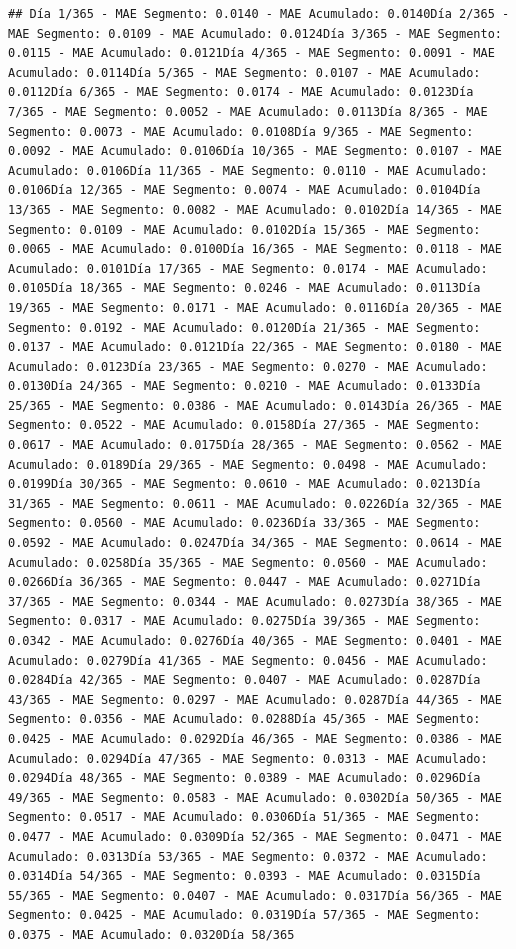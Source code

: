 \documentclass[
]{book}
\begin{document}
\begin{verbatim}
## Día 1/365 - MAE Segmento: 0.0140 - MAE Acumulado: 0.0140Día 2/365 - MAE Segmento: 0.0109 - MAE Acumulado: 0.0124Día 3/365 - MAE Segmento: 0.0115 - MAE Acumulado: 0.0121Día 4/365 - MAE Segmento: 0.0091 - MAE Acumulado: 0.0114Día 5/365 - MAE Segmento: 0.0107 - MAE Acumulado: 0.0112Día 6/365 - MAE Segmento: 0.0174 - MAE Acumulado: 0.0123Día 7/365 - MAE Segmento: 0.0052 - MAE Acumulado: 0.0113Día 8/365 - MAE Segmento: 0.0073 - MAE Acumulado: 0.0108Día 9/365 - MAE Segmento: 0.0092 - MAE Acumulado: 0.0106Día 10/365 - MAE Segmento: 0.0107 - MAE Acumulado: 0.0106Día 11/365 - MAE Segmento: 0.0110 - MAE Acumulado: 0.0106Día 12/365 - MAE Segmento: 0.0074 - MAE Acumulado: 0.0104Día 13/365 - MAE Segmento: 0.0082 - MAE Acumulado: 0.0102Día 14/365 - MAE Segmento: 0.0109 - MAE Acumulado: 0.0102Día 15/365 - MAE Segmento: 0.0065 - MAE Acumulado: 0.0100Día 16/365 - MAE Segmento: 0.0118 - MAE Acumulado: 0.0101Día 17/365 - MAE Segmento: 0.0174 - MAE Acumulado: 0.0105Día 18/365 - MAE Segmento: 0.0246 - MAE Acumulado: 0.0113Día 19/365 - MAE Segmento: 0.0171 - MAE Acumulado: 0.0116Día 20/365 - MAE Segmento: 0.0192 - MAE Acumulado: 0.0120Día 21/365 - MAE Segmento: 0.0137 - MAE Acumulado: 0.0121Día 22/365 - MAE Segmento: 0.0180 - MAE Acumulado: 0.0123Día 23/365 - MAE Segmento: 0.0270 - MAE Acumulado: 0.0130Día 24/365 - MAE Segmento: 0.0210 - MAE Acumulado: 0.0133Día 25/365 - MAE Segmento: 0.0386 - MAE Acumulado: 0.0143Día 26/365 - MAE Segmento: 0.0522 - MAE Acumulado: 0.0158Día 27/365 - MAE Segmento: 0.0617 - MAE Acumulado: 0.0175Día 28/365 - MAE Segmento: 0.0562 - MAE Acumulado: 0.0189Día 29/365 - MAE Segmento: 0.0498 - MAE Acumulado: 0.0199Día 30/365 - MAE Segmento: 0.0610 - MAE Acumulado: 0.0213Día 31/365 - MAE Segmento: 0.0611 - MAE Acumulado: 0.0226Día 32/365 - MAE Segmento: 0.0560 - MAE Acumulado: 0.0236Día 33/365 - MAE Segmento: 0.0592 - MAE Acumulado: 0.0247Día 34/365 - MAE Segmento: 0.0614 - MAE Acumulado: 0.0258Día 35/365 - MAE Segmento: 0.0560 - MAE Acumulado: 0.0266Día 36/365 - MAE Segmento: 0.0447 - MAE Acumulado: 0.0271Día 37/365 - MAE Segmento: 0.0344 - MAE Acumulado: 0.0273Día 38/365 - MAE Segmento: 0.0317 - MAE Acumulado: 0.0275Día 39/365 - MAE Segmento: 0.0342 - MAE Acumulado: 0.0276Día 40/365 - MAE Segmento: 0.0401 - MAE Acumulado: 0.0279Día 41/365 - MAE Segmento: 0.0456 - MAE Acumulado: 0.0284Día 42/365 - MAE Segmento: 0.0407 - MAE Acumulado: 0.0287Día 43/365 - MAE Segmento: 0.0297 - MAE Acumulado: 0.0287Día 44/365 - MAE Segmento: 0.0356 - MAE Acumulado: 0.0288Día 45/365 - MAE Segmento: 0.0425 - MAE Acumulado: 0.0292Día 46/365 - MAE Segmento: 0.0386 - MAE Acumulado: 0.0294Día 47/365 - MAE Segmento: 0.0313 - MAE Acumulado: 0.0294Día 48/365 - MAE Segmento: 0.0389 - MAE Acumulado: 0.0296Día 49/365 - MAE Segmento: 0.0583 - MAE Acumulado: 0.0302Día 50/365 - MAE Segmento: 0.0517 - MAE Acumulado: 0.0306Día 51/365 - MAE Segmento: 0.0477 - MAE Acumulado: 0.0309Día 52/365 - MAE Segmento: 0.0471 - MAE Acumulado: 0.0313Día 53/365 - MAE Segmento: 0.0372 - MAE Acumulado: 0.0314Día 54/365 - MAE Segmento: 0.0393 - MAE Acumulado: 0.0315Día 55/365 - MAE Segmento: 0.0407 - MAE Acumulado: 0.0317Día 56/365 - MAE Segmento: 0.0425 - MAE Acumulado: 0.0319Día 57/365 - MAE Segmento: 0.0375 - MAE Acumulado: 0.0320Día 58/365 
\end{verbatim}
\end{document}
